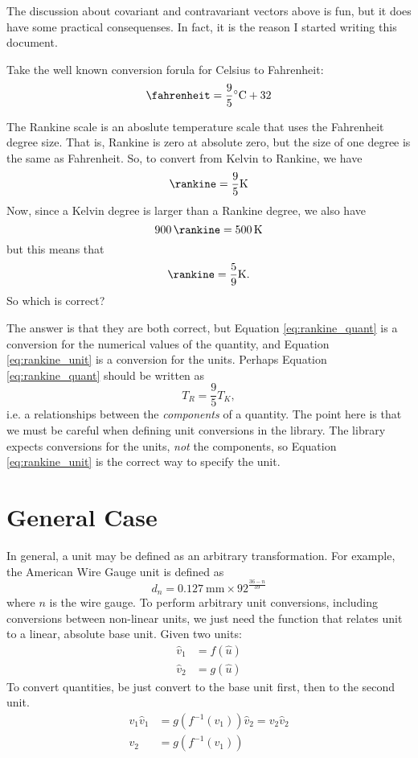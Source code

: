 \documentclass[letterpaper,10pt]{article}
\begin{document}
The discussion about covariant and contravariant vectors above is fun, but it does have some practical consequenses. In fact, it is the reason
I started writing this document.

Take the well known conversion forula for Celsius to Fahrenheit:
$$
\si{\fahrenheit} = \frac{9}{5} \si{\celsius} + 32
$$

The Rankine scale is an aboslute temperature scale that uses the Fahrenheit degree size. That is, Rankine is zero at absolute zero, but
the size of one degree is the same as Fahrenheit. So, to convert from Kelvin to Rankine, we have
\begin{equation}
  \label{eq:rankine_quant}
\si{\rankine} = \frac{9}{5} \si{\kelvin}
\end{equation}
Now, since a Kelvin degree is larger than a Rankine degree, we also have
$$
\SI{900}{\rankine} = \SI{500}{\kelvin}
$$
but this means that 
\begin{equation}
  \label{eq:rankine_unit}
\si{\rankine} = \frac{5}{9}\si{\kelvin}.
\end{equation}
So which is correct?

The answer is that they are both correct, but Equation \ref{eq:rankine_quant} is a conversion for the numerical values of the quantity, and
Equation \ref{eq:rankine_unit} is a conversion for the units. Perhaps Equation \ref{eq:rankine_quant} should be written as
\begin{equation}
  T_R = \frac{9}{5} T_K,
\end{equation}
i.e. a relationships between the \emph{components} of a quantity. The point here is that we must be careful when defining unit conversions
in the library. The library expects conversions for the units, \emph{not} the components, so Equation \ref{eq:rankine_unit} is the correct way
to specify the unit.

\section{General Case}

In general, a unit may be defined as an arbitrary transformation. For example, the American Wire Gauge unit is defined as
$$
d_n = \SI{0.127}{\milli\meter} \times 92^{\frac{36 - n}{39}}
$$
where $n$ is the wire gauge. To perform arbitrary unit conversions, including conversions between non-linear units, we just need the
function that relates unit to a linear, absolute base unit. Given two units:
\begin{align}
\hat{v}_1 &= f(\hat{u}) \\
\hat{v}_2 &= g(\hat{u})
\end{align}
To convert quantities, be just convert to the base unit first, then to the second unit.
\begin{align}
v_1 \hat{v}_1 &= g(f^{-1}(v_1)) \hat{v}_2 = v_2 \hat{v}_2 \\
v_2 &= g(f^{-1}(v_1))
\end{align}
\end{document}
